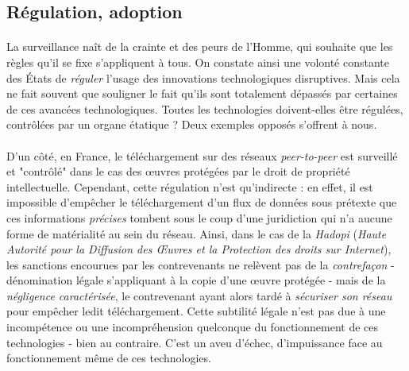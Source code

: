 \subsection*{Régulation, adoption}

\paragraph{} La surveillance naît de la crainte et des peurs de l'Homme, qui souhaite que les règles qu'il se fixe 
s'appliquent à tous. On constate ainsi une volonté constante des États de \emph{réguler} l'usage des innovations technologiques
disruptives. Mais cela ne fait souvent que souligner le fait qu'ils sont totalement dépassés par certaines de ces 
avancées technologiques. Toutes les technologies doivent-elles être régulées, contrôlées par un organe étatique ? Deux 
exemples opposés s'offrent à nous. 

\paragraph{} D'un côté, en France, le téléchargement sur des réseaux \emph{peer-to-peer} est surveillé et "contrôlé" 
dans le cas des \oe{}uvres protégées par le droit de propriété intellectuelle. Cependant, cette régulation n'est qu'indirecte :
en effet, il est impossible d'empêcher le téléchargement d'un flux de données sous prétexte que ces informations \emph{précises}
tombent sous le coup d'une juridiction qui n'a aucune forme de matérialité au sein du réseau. Ainsi, dans le cas de la
\emph{Hadopi} (\emph{Haute Autorité pour la Diffusion des \OE{}uvres et la Protection des droits sur Internet}), les sanctions
encourues par les contrevenants ne relèvent pas de la \emph{contrefaçon} - dénomination légale s'appliquant à la copie d'une
\oe{}uvre protégée - mais de la \emph{négligence caractérisée}, le contrevenant ayant alors tardé à \emph{sécuriser son
réseau} pour empêcher ledit téléchargement. Cette subtilité légale n'est pas due à une incompétence ou une incompréhension
quelconque du fonctionnement de ces technologies - bien au contraire. C'est un aveu d'échec, d'impuissance face au fonctionnement
même de ces technologies.

